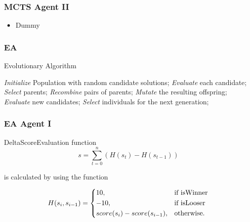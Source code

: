 \documentclass{beamer}
\begin{document}
\begin{frame}
\frametitle{MCTS Agent II}
\begin{itemize}
 \item Dummy
\end{itemize}
\end{frame}


\begin{frame}
\frametitle{EA}


\begin{algorithm}
\caption{Evolutionary Algorithm~\cite{evo}}
\label{alg:evo}
\begin{algorithmic}
\State \emph{Initialize} Population with random candidate solutions;
\State \emph{Evaluate} each candidate;
\State \emph{Select} parents;
\State \emph{Recombine} pairs of parents;
\State \emph{Mutate} the resulting offspring;
\State \emph{Evaluate} new candidates;
\State \emph{Select} individuals for the next generation;
\EndWhile
\end{algorithmic}
\end{algorithm}


\end{frame}





\begin{frame}
\frametitle{EA Agent I}

DeltaScoreEvaluation function 
\begin{equation*}
s = \sum_{t=0}^n (H(s_t) - H(s_{t-1}))
\end{equation*}

is calculated by using the function

\begin{equation*}
    H(s_i, s_{i-1}) = 
\begin{dcases}
    10, & \text{if isWinner}  \\
    -10, & \text{if isLooser}  \\
    score(s_i) - score(s_{i-1}), & \text{otherwise.}
\end{dcases}
\end{equation*}
\end{frame}
\end{document}

